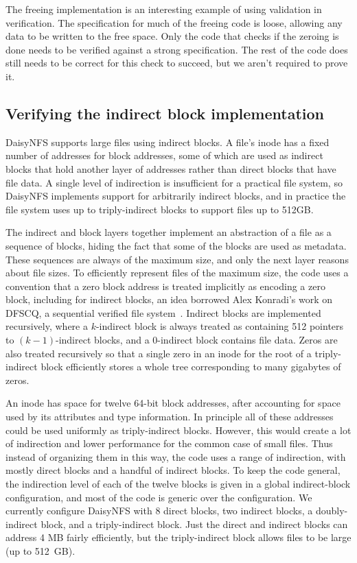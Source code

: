 The freeing implementation is an interesting example of using validation in
verification. The specification for much of the freeing code is loose, allowing
any data to be written to the free space. Only the code that checks if the
zeroing is done needs to be verified against a strong specification. The rest of
the code does still needs to be correct for this check to succeed, but we
aren't required to prove it.

\subsection{Verifying the indirect block implementation}%
\label{sec:dafny:indirect}

DaisyNFS supports large files using indirect blocks. A file's inode has a fixed
number of addresses for block addresses, some of which are used as indirect
blocks that hold another layer of addresses rather than direct blocks that have
file data. A single level of indirection is insufficient for a practical file
system, so DaisyNFS implements support for arbitrarily indirect blocks, and in
practice the file system uses up to triply-indirect blocks to support files up
to 512GB.\@

The indirect and block layers together implement an abstraction of a file as a
sequence of blocks, hiding the fact that some of the blocks are used as
metadata. These sequences are always of the maximum size, and only the next
layer reasons about file sizes. To efficiently represent files of the maximum
size, the code uses a convention that a zero block address is treated implicitly
as encoding a zero block, including for indirect blocks, an idea borrowed Alex
Konradi's work on DFSCQ, a sequential verified file system~\cite{akonradi-meng}.
Indirect blocks are implemented recursively, where a
$k$-indirect block is always treated as containing 512 pointers to
$(k-1)$-indirect blocks, and a 0-indirect block contains file data. Zeros are
also treated recursively so that a single zero in an inode for the root of a
triply-indirect block efficiently stores a whole tree corresponding to many
gigabytes of zeros.

An inode has space for twelve 64-bit block addresses, after accounting for space
used by its attributes and type information. In principle all of these addresses
could be used uniformly as triply-indirect blocks. However, this would create a
lot of indirection and lower performance for the common case of small files.
Thus instead of organizing them in this way, the code uses a range of indirection, with
mostly direct blocks and a handful of indirect blocks. To keep the code general,
the indirection level of each of the twelve blocks is given in a global
indirect-block configuration, and most of the code is generic over the configuration. We currently
configure DaisyNFS with 8 direct blocks, two indirect blocks, a doubly-indirect
block, and a triply-indirect block. Just the direct and indirect blocks can address 4
MB fairly efficiently, but the triply-indirect block allows files to be large
(up to 512~GB).

